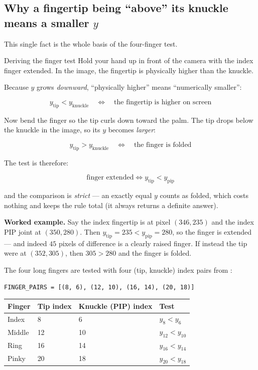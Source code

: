 \subsection{Why a fingertip being ``above'' its knuckle means a smaller $y$}

This single fact is the whole basis of the four-finger test.

\begin{mathdeepdive}{Deriving the finger test}
Hold your hand up in front of the camera with the index finger extended. In the image, the
fingertip is physically higher than the knuckle.

Because $y$ grows \emph{downward}, ``physically higher'' means ``numerically smaller'':

$$y_{\text{tip}} < y_{\text{knuckle}} \quad \Longleftrightarrow \quad \text{the fingertip is higher on screen}$$

Now bend the finger so the tip curls down toward the palm. The tip drops below the knuckle in the
image, so its $y$ becomes \emph{larger}:

$$y_{\text{tip}} > y_{\text{knuckle}} \quad \Longleftrightarrow \quad \text{the finger is folded}$$

The test is therefore:

$$\text{finger extended} \iff y_{\text{tip}} < y_{\text{pip}}$$

and the comparison is \emph{strict} --- an exactly equal $y$ counts as folded, which costs nothing
and keeps the rule total (it always returns a definite answer).

\textbf{Worked example.} Say the index fingertip is at pixel $(346, 235)$ and the index PIP joint at
$(350, 280)$. Then $y_{\text{tip}} = 235 < y_{\text{pip}} = 280$, so the finger is extended --- and
indeed $45$ pixels of difference is a clearly raised finger. If instead the tip were at
$(352, 305)$, then $305 > 280$ and the finger is folded.
\end{mathdeepdive}

The four long fingers are tested with four (tip, knuckle) index pairs from :

\begin{codecard}
\begin{lstlisting}
FINGER_PAIRS = [(8, 6), (12, 10), (16, 14), (20, 18)]
\end{lstlisting}
\end{codecard}

\begin{center}
\begin{tabular}{@{}l l l l@{}}
\toprule
\rowcolor{white}
\textbf{Finger} & \textbf{Tip index} & \textbf{Knuckle (PIP) index} & \textbf{Test} \\
\midrule
Index  & 8  & 6  & $y_8 < y_6$ \\
Middle & 12 & 10 & $y_{12} < y_{10}$ \\
Ring   & 16 & 14 & $y_{16} < y_{14}$ \\
Pinky  & 20 & 18 & $y_{20} < y_{18}$ \\
\bottomrule
\end{tabular}
\end{center}

